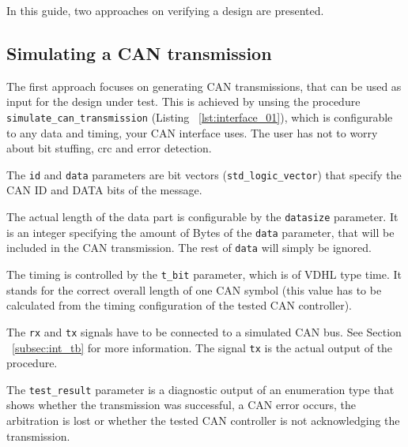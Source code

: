 In this guide, two approaches on verifying a design are presented.





\subsection{Simulating a CAN transmission}
The first approach focuses on generating CAN transmissions, that can be used as input for the design under test. This is achieved by unsing the procedure \verb=simulate_can_transmission= (Listing ~\ref{lst:interface_01}), which is configurable to any data and timing, your CAN interface uses. The user has not to worry about bit stuffing, crc and error detection.

The \verb=id= and \verb=data= parameters are bit vectors (\verb=std_logic_vector=) that specify the CAN ID and DATA bits of the message.

The actual length of the data part is configurable by the \verb=datasize= parameter. It is an integer specifying the amount of Bytes of the \verb=data= parameter, that will be included in the CAN transmission. The rest of \verb=data= will simply be ignored.

The timing is controlled by the \verb=t_bit= parameter, which is of VDHL type time.
It stands for the correct overall length of one CAN symbol (this value has to be calculated from the timing configuration of the tested CAN controller).

The \verb=rx= and \verb=tx= signals have to be connected to a simulated CAN bus. See Section ~\ref{subsec:int_tb} for more information. The signal \verb=tx= is the actual output of the procedure.

The \verb=test_result= parameter is a diagnostic output of an enumeration type that shows whether the transmission was successful, a CAN error occurs, the arbitration is lost or whether the tested CAN controller is not acknowledging the transmission.

